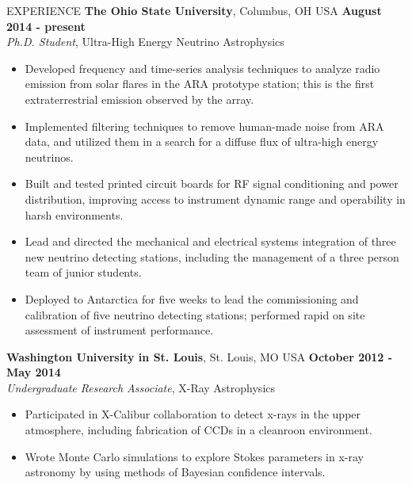 \documentclass{resume} %
\begin{document}
\begin{rSection}{EXPERIENCE}
{\bf The Ohio State University}, Columbus, OH USA \hfill {\bf August 2014 - present} \\
{\em Ph.D. Student}, Ultra-High Energy Neutrino Astrophysics
\begin{itemize}
\vspace*{.05in}
\item Developed frequency and time-series analysis techniques to analyze radio emission from solar flares in the ARA prototype station; this is the first extraterrestrial emission observed by the array.
\item Implemented filtering techniques to remove human-made noise from ARA data, and utilized them in a search for a diffuse flux of ultra-high energy neutrinos.
\item Built and tested printed circuit boards for RF signal conditioning and power distribution, improving access to instrument dynamic range and operability in harsh environments.
\item Lead and directed the mechanical and electrical systems integration of three new neutrino detecting stations, including the management of a three person team of junior students.
\item Deployed to Antarctica for five weeks to lead the commissioning and calibration of five neutrino detecting stations; performed rapid on site assessment of instrument performance.
\end{itemize}

{\bf Washington University in St. Louis}, St. Louis, MO USA \hfill {\bf October 2012 - May 2014}\\
{\em Undergraduate Research Associate}, X-Ray Astrophysics
\begin{itemize}
\vspace*{.05in}
\item Participated in X-Calibur collaboration to detect x-rays in the upper atmosphere, including fabrication of CCDs in a cleanroon environment.
\item Wrote Monte Carlo simulations to explore Stokes parameters in x-ray astronomy by using methods of Bayesian confidence intervals.
\end{itemize}
\end{rSection}

\newpage
\end{document}
